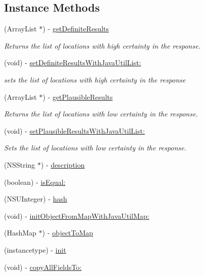 \subsection*{Instance Methods}
\begin{DoxyCompactItemize}
\item 
(Array\+List $\ast$) -\/ \hyperlink{interface_resolved_locations_response_add531dfac4994edc75512e1b4ae46e14}{get\+Definite\+Results}
\begin{DoxyCompactList}\small\item\em Returns the list of locations with high certainty in the response. \end{DoxyCompactList}\item 
(void) -\/ \hyperlink{interface_resolved_locations_response_a301b3275b28e0d75733b3476bdad69d6}{set\+Definite\+Results\+With\+Java\+Util\+List\+:}
\begin{DoxyCompactList}\small\item\em sets the list of locations with high certainty in the response \end{DoxyCompactList}\item 
(Array\+List $\ast$) -\/ \hyperlink{interface_resolved_locations_response_a4ca13f3d93e9a616af1ad6521680f281}{get\+Plausible\+Results}
\begin{DoxyCompactList}\small\item\em Returns the list of locations with low certainty in the response. \end{DoxyCompactList}\item 
(void) -\/ \hyperlink{interface_resolved_locations_response_a3d6829376ede82e2eee904bf73a8946d}{set\+Plausible\+Results\+With\+Java\+Util\+List\+:}
\begin{DoxyCompactList}\small\item\em Sets the list of locations with low certainty in the response. \end{DoxyCompactList}\item 
(N\+S\+String $\ast$) -\/ \hyperlink{interface_resolved_locations_response_a34bb2a56647626caec2cdd16da2f1fe2}{description}
\item 
(boolean) -\/ \hyperlink{interface_resolved_locations_response_a22c97deab9d3efc33f0d4aedd5f9a8af}{is\+Equal\+:}
\item 
(N\+S\+U\+Integer) -\/ \hyperlink{interface_resolved_locations_response_a826689383dcc7b3f04391aa49b4c9136}{hash}
\item 
(void) -\/ \hyperlink{interface_resolved_locations_response_a060889486649f8498142c5356e2c8637}{init\+Object\+From\+Map\+With\+Java\+Util\+Map\+:}
\item 
(Hash\+Map $\ast$) -\/ \hyperlink{interface_resolved_locations_response_aed07d6f865081b7ea4e97d288fa881ea}{object\+To\+Map}
\item 
(instancetype) -\/ \hyperlink{interface_resolved_locations_response_aab173837b9b64bf5db2ba8178279ed25}{init}
\item 
(void) -\/ \hyperlink{interface_resolved_locations_response_a98033ec46c7208b2df4e7928b7d755f2}{copy\+All\+Fields\+To\+:}
\end{DoxyCompactItemize}
